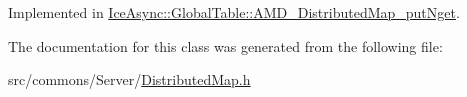 Implemented in \hyperlink{class_ice_async_1_1_global_table_1_1_a_m_d___distributed_map__put_nget_ac8be69737e1c3604a144dbdeb6653b8d}{IceAsync::GlobalTable::AMD\_\-DistributedMap\_\-putNget}.



The documentation for this class was generated from the following file:\begin{DoxyCompactItemize}
\item 
src/commons/Server/\hyperlink{_distributed_map_8h}{DistributedMap.h}\end{DoxyCompactItemize}
